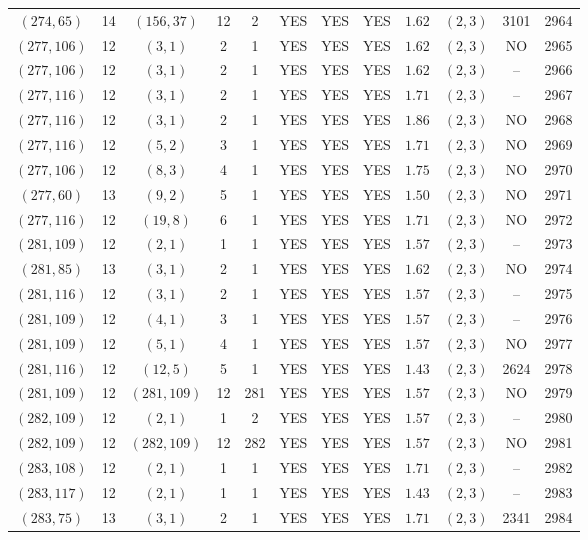 \begin{longtable}{|c|c|c|c|c|c|c|c|c|c|c|c|}
$(274,65)$ & 14 & $(156,37)$ & 12 & 2 & YES & YES & YES & $1.62$ & $(2,3)$ & 3101 & 2964\\
$(277,106)$ & 12 & $(3,1)$ & 2 & 1 & YES & YES & YES & $1.62$ & $(2,3)$ & NO & 2965\\
$(277,106)$ & 12 & $(3,1)$ & 2 & 1 & YES & YES & YES & $1.62$ & $(2,3)$ & -- & 2966\\
$(277,116)$ & 12 & $(3,1)$ & 2 & 1 & YES & YES & YES & $1.71$ & $(2,3)$ & -- & 2967\\
$(277,116)$ & 12 & $(3,1)$ & 2 & 1 & YES & YES & YES & $1.86$ & $(2,3)$ & NO & 2968\\
$(277,116)$ & 12 & $(5,2)$ & 3 & 1 & YES & YES & YES & $1.71$ & $(2,3)$ & NO & 2969\\
$(277,106)$ & 12 & $(8,3)$ & 4 & 1 & YES & YES & YES & $1.75$ & $(2,3)$ & NO & 2970\\
$(277,60)$ & 13 & $(9,2)$ & 5 & 1 & YES & YES & YES & $1.50$ & $(2,3)$ & NO & 2971\\
$(277,116)$ & 12 & $(19,8)$ & 6 & 1 & YES & YES & YES & $1.71$ & $(2,3)$ & NO & 2972\\
$(281,109)$ & 12 & $(2,1)$ & 1 & 1 & YES & YES & YES & $1.57$ & $(2,3)$ & -- & 2973\\
$(281,85)$ & 13 & $(3,1)$ & 2 & 1 & YES & YES & YES & $1.62$ & $(2,3)$ & NO & 2974\\
$(281,116)$ & 12 & $(3,1)$ & 2 & 1 & YES & YES & YES & $1.57$ & $(2,3)$ & -- & 2975\\
$(281,109)$ & 12 & $(4,1)$ & 3 & 1 & YES & YES & YES & $1.57$ & $(2,3)$ & -- & 2976\\
$(281,109)$ & 12 & $(5,1)$ & 4 & 1 & YES & YES & YES & $1.57$ & $(2,3)$ & NO & 2977\\
$(281,116)$ & 12 & $(12,5)$ & 5 & 1 & YES & YES & YES & $1.43$ & $(2,3)$ & 2624 & 2978\\
$(281,109)$ & 12 & $(281,109)$ & 12 & 281 & YES & YES & YES & $1.57$ & $(2,3)$ & NO & 2979\\
$(282,109)$ & 12 & $(2,1)$ & 1 & 2 & YES & YES & YES & $1.57$ & $(2,3)$ & -- & 2980\\
$(282,109)$ & 12 & $(282,109)$ & 12 & 282 & YES & YES & YES & $1.57$ & $(2,3)$ & NO & 2981\\
$(283,108)$ & 12 & $(2,1)$ & 1 & 1 & YES & YES & YES & $1.71$ & $(2,3)$ & -- & 2982\\
$(283,117)$ & 12 & $(2,1)$ & 1 & 1 & YES & YES & YES & $1.43$ & $(2,3)$ & -- & 2983\\
$(283,75)$ & 13 & $(3,1)$ & 2 & 1 & YES & YES & YES & $1.71$ & $(2,3)$ & 2341 & 2984\\

\end{longtable}
